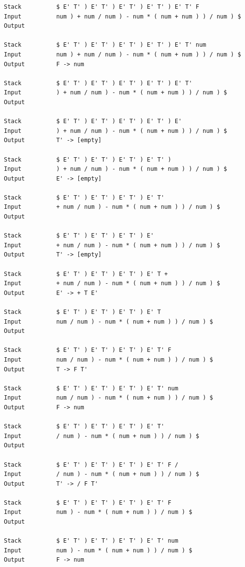 \documentclass[lang=cn,11pt,a4paper,cite=authornum]{paper}
\begin{document}
\begin{code}
\begin{verbatim}
Stack          $ E' T' ) E' T' ) E' T' ) E' T' ) E' T' F 
Input          num ) + num / num ) - num * ( num + num ) ) / num ) $ 
Output         

Stack          $ E' T' ) E' T' ) E' T' ) E' T' ) E' T' num 
Input          num ) + num / num ) - num * ( num + num ) ) / num ) $ 
Output         F -> num 

Stack          $ E' T' ) E' T' ) E' T' ) E' T' ) E' T' 
Input          ) + num / num ) - num * ( num + num ) ) / num ) $ 
Output         

Stack          $ E' T' ) E' T' ) E' T' ) E' T' ) E' 
Input          ) + num / num ) - num * ( num + num ) ) / num ) $ 
Output         T' -> [empty] 

Stack          $ E' T' ) E' T' ) E' T' ) E' T' ) 
Input          ) + num / num ) - num * ( num + num ) ) / num ) $ 
Output         E' -> [empty] 

Stack          $ E' T' ) E' T' ) E' T' ) E' T' 
Input          + num / num ) - num * ( num + num ) ) / num ) $ 
Output         

Stack          $ E' T' ) E' T' ) E' T' ) E' 
Input          + num / num ) - num * ( num + num ) ) / num ) $ 
Output         T' -> [empty] 

Stack          $ E' T' ) E' T' ) E' T' ) E' T + 
Input          + num / num ) - num * ( num + num ) ) / num ) $ 
Output         E' -> + T E' 

Stack          $ E' T' ) E' T' ) E' T' ) E' T 
Input          num / num ) - num * ( num + num ) ) / num ) $ 
Output         

Stack          $ E' T' ) E' T' ) E' T' ) E' T' F 
Input          num / num ) - num * ( num + num ) ) / num ) $ 
Output         T -> F T' 

Stack          $ E' T' ) E' T' ) E' T' ) E' T' num 
Input          num / num ) - num * ( num + num ) ) / num ) $ 
Output         F -> num 

Stack          $ E' T' ) E' T' ) E' T' ) E' T' 
Input          / num ) - num * ( num + num ) ) / num ) $ 
Output         

Stack          $ E' T' ) E' T' ) E' T' ) E' T' F / 
Input          / num ) - num * ( num + num ) ) / num ) $ 
Output         T' -> / F T' 

Stack          $ E' T' ) E' T' ) E' T' ) E' T' F 
Input          num ) - num * ( num + num ) ) / num ) $ 
Output         

Stack          $ E' T' ) E' T' ) E' T' ) E' T' num 
Input          num ) - num * ( num + num ) ) / num ) $ 
Output         F -> num 


\end{verbatim}
\end{code}
\end{document}

